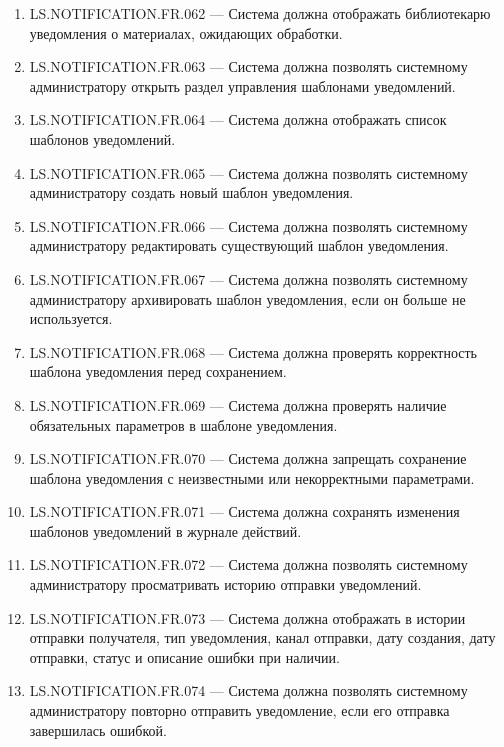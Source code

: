 \documentclass[12pt,a4paper]{article}
\begin{document}
\begin{enumerate}
		\item LS.NOTIFICATION.FR.062 --- Система должна отображать библиотекарю уведомления
		о материалах, ожидающих обработки.
		
		\item LS.NOTIFICATION.FR.063 --- Система должна позволять системному администратору
		открыть раздел управления шаблонами уведомлений.
		
		\item LS.NOTIFICATION.FR.064 --- Система должна отображать список шаблонов
		уведомлений.
		
		\item LS.NOTIFICATION.FR.065 --- Система должна позволять системному администратору
		создать новый шаблон уведомления.
		
		\item LS.NOTIFICATION.FR.066 --- Система должна позволять системному администратору
		редактировать существующий шаблон уведомления.
		
		\item LS.NOTIFICATION.FR.067 --- Система должна позволять системному администратору
		архивировать шаблон уведомления, если он больше не используется.
		
		\item LS.NOTIFICATION.FR.068 --- Система должна проверять корректность шаблона
		уведомления перед сохранением.
		
		\item LS.NOTIFICATION.FR.069 --- Система должна проверять наличие обязательных
		параметров в шаблоне уведомления.
		
		\item LS.NOTIFICATION.FR.070 --- Система должна запрещать сохранение шаблона
		уведомления с неизвестными или некорректными параметрами.
		
		\item LS.NOTIFICATION.FR.071 --- Система должна сохранять изменения шаблонов
		уведомлений в журнале действий.
		
		\item LS.NOTIFICATION.FR.072 --- Система должна позволять системному администратору
		просматривать историю отправки уведомлений.
		
		\item LS.NOTIFICATION.FR.073 --- Система должна отображать в истории отправки
		получателя, тип уведомления, канал отправки, дату создания, дату отправки, статус
		и описание ошибки при наличии.
		
		\item LS.NOTIFICATION.FR.074 --- Система должна позволять системному администратору
		повторно отправить уведомление, если его отправка завершилась ошибкой.
		

\end{enumerate}
\end{document}
